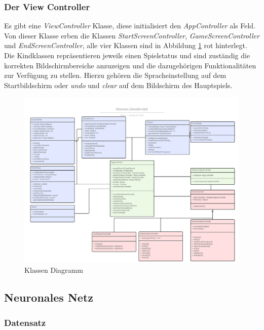 \documentclass[11pt]{article}
\begin{document}
\subsubsection{Der View Controller}
Es gibt eine \textit{ViewController} Klasse, diese initialisiert den \textit{AppController} als Feld. Von dieser Klasse erben die Klassen \textit{StartScreenController}, \textit{GameScreenController} und \textit{EndScreenController}, alle vier Klassen sind in Abbildung \ref{fig:classDiagram} rot hinterlegt. Die Kindklassen repräsentieren jeweils einen Spielstatus und sind zuständig die korrekten Bildschirmbereiche anzuzeigen und die dazugehörigen Funktionalitäten zur Verfügung zu stellen. Hierzu gehören die Spracheinstellung auf dem Startbildschirm oder \textit{undo} und \textit{clear} auf dem Bildschirm des Hauptspiels.

\begin{figure}[ht]
\centering
\includegraphics[width=1\textwidth]{images/classDiagramSkribbl.png}
\caption{\label{fig:classDiagram}Klassen Diagramm}
\end{figure}

\newpage
\subsection{Neuronales Netz}
\subsubsection{Datensatz}
\end{document}
